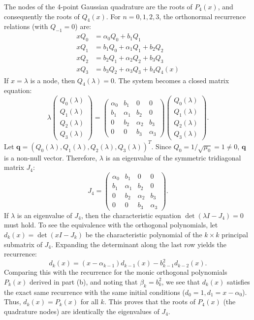\begin{solution}
The nodes of the 4-point Gaussian quadrature are the roots of $P_4(x)$, and consequently the roots of $Q_4(x)$. For $n = 0, 1, 2, 3$, the orthonormal recurrence relations (with $Q_{-1} = 0$) are:
\begin{align*}
    x Q_0 &= \alpha_0 Q_0 + b_1 Q_1 \\
    x Q_1 &= b_1 Q_0 + \alpha_1 Q_1 + b_2 Q_2 \\
    x Q_2 &= b_2 Q_1 + \alpha_2 Q_2 + b_3 Q_3 \\
    x Q_3 &= b_3 Q_2 + \alpha_3 Q_3 + b_4 Q_4(x)
\end{align*}
If $x = \lambda$ is a node, then $Q_4(\lambda) = 0$. The system becomes a closed matrix equation:
\[ \lambda \begin{pmatrix} Q_0(\lambda) \\ Q_1(\lambda) \\ Q_2(\lambda) \\ Q_3(\lambda) \end{pmatrix} = \begin{pmatrix} \alpha_0 & b_1 & 0 & 0 \\ b_1 & \alpha_1 & b_2 & 0 \\ 0 & b_2 & \alpha_2 & b_3 \\ 0 & 0 & b_3 & \alpha_3 \end{pmatrix} \begin{pmatrix} Q_0(\lambda) \\ Q_1(\lambda) \\ Q_2(\lambda) \\ Q_3(\lambda) \end{pmatrix}. \]
Let $\mathbf{q} = (Q_0(\lambda), Q_1(\lambda), Q_2(\lambda), Q_3(\lambda))^T$. Since $Q_0 = 1/\sqrt{\mu_0} = 1 \neq 0$, $\mathbf{q}$ is a non-null vector. Therefore, $\lambda$ is an eigenvalue of the symmetric tridiagonal matrix $J_4$:
\[ J_4 = \begin{pmatrix} \alpha_0 & b_1 & 0 & 0 \\ b_1 & \alpha_1 & b_2 & 0 \\ 0 & b_2 & \alpha_2 & b_3 \\ 0 & 0 & b_3 & \alpha_3 \end{pmatrix}. \]
If $\lambda$ is an eigenvalue of $J_4$, then the characteristic equation $\det(\lambda I - J_4) = 0$ must hold. To see the equivalence with the orthogonal polynomials, let $d_k(x) = \det(x I - J_k)$ be the characteristic polynomial of the $k \times k$ principal submatrix of $J_4$. Expanding the determinant along the last row yields the recurrence:
\[ d_k(x) = (x - \alpha_{k-1}) d_{k-1}(x) - b_{k-1}^2 d_{k-2}(x). \]
Comparing this with the recurrence for the monic orthogonal polynomials $P_k(x)$ derived in part (b), and noting that $\beta_k = b_k^2$, we see that $d_k(x)$ satisfies the exact same recurrence with the same initial conditions ($d_0 = 1, d_1 = x - \alpha_0$). Thus, $d_k(x) = P_k(x)$ for all $k$. This proves that the roots of $P_4(x)$ (the quadrature nodes) are identically the eigenvalues of $J_4$.
\end{solution}

